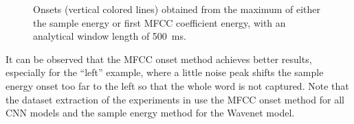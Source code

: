 \begin{figure}[!ht]
  \centering
  \caption{Onsets (vertical colored lines) obtained from the maximum of either the sample energy or first MFCC coefficient energy, with an analytical window length of \SI{500}{\milli\second}.}
  \label{fig:signal_onset_showcase}
\end{figure}
\FloatBarrier
\noindent
It can be observed that the MFCC onset method achieves better results, especially for the \enquote{left} example, where a little noise peak shifts the sample energy onset too far to the left so that the whole word is not captured.
Note that the dataset extraction of the experiments in  use the MFCC onset method for all CNN models and the sample energy method for the Wavenet model.


